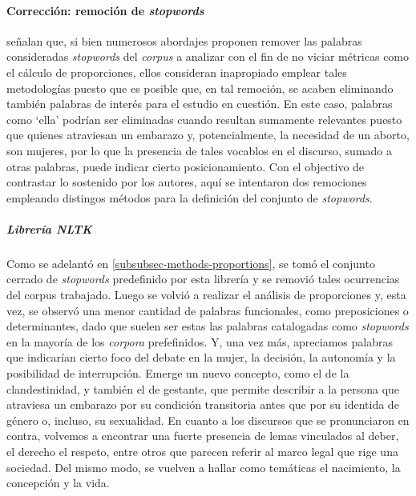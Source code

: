 \paragraph{Correcci\'on: remoci\'on de \textit{stopwords}}
\cite{monroe2008fightin} señalan que, si bien numerosos abordajes proponen remover
las palabras consideradas \textit{stopwords} del \textit{corpus} a analizar con el
fin de no viciar m\'etricas como el c\'alculo de proporciones, ellos consideran inapropiado
emplear tales metodolog\'ias puesto que es posible que, en tal remoci\'on, se acaben
eliminando tambi\'en palabras de inter\'es para el estudio en cuesti\'on. En este caso,
palabras como `ella' podr\'ian ser eliminadas cuando resultan sumamente relevantes
puesto que quienes atraviesan un embarazo y, potencialmente, la necesidad de un
aborto, son mujeres, por lo que la presencia de tales vocablos en el discurso, sumado
a otras palabras, puede indicar cierto posicionamiento. Con el objectivo de
contrastar lo sostenido por los autores, aqu\'i se intentaron dos remociones empleando
distingos m\'etodos para la definici\'on del conjunto de \textit{stopwords}.

\subparagraph{Librer\'ia NLTK}
Como se adelant\'o en \ref{subsubsec-methods-proportions}, se tom\'o el conjunto cerrado de
\textit{stopwords} predefinido por esta librer\'ia y se removi\'o tales ocurrencias
del corpus trabajado.
Luego se volvi\'o a realizar el an\'alisis de proporciones y, esta
vez, se observ\'o una menor cantidad de palabras funcionales,
como preposiciones o determinantes, dado que suelen ser estas
las palabras catalogadas como \textit{stopwords} en la mayor\'ia de
los \textit{corpora} prefefinidos. Y, una vez m\'as, apreciamos palabras que indicar\'ian
cierto foco del debate en la mujer, la decisi\'on, la autonom\'ia y la posibilidad de
interrupci\'on. Emerge un nuevo concepto, como el de la clandestinidad, y tambi\'en
el de gestante, que permite describir a la persona que atraviesa un embarazo por
su condici\'on transitoria antes que por su identida de g\'enero o, incluso, su
sexualidad.
En cuanto a los discursos que se pronunciaron en contra, volvemos a
encontrar una fuerte presencia de lemas vinculados al deber, el derecho
el respeto, entre otros que parecen referir al marco legal que rige una
sociedad. Del mismo modo, se vuelven a hallar como tem\'aticas el nacimiento,
la concepci\'on y la vida.

